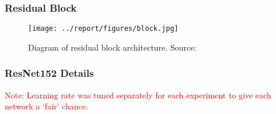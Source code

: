 \documentclass[11pt]{beamer}
\begin{document}
\begin{frame}
	\frametitle{Residual Block}

	\begin{figure}[h]
	\begin{center}
	\vspace*{-0.5cm}
	\texttt{[image: ../report/figures/block.jpg]}
	\caption[caption]{Diagram of residual block architecture. Source: \cite{dive}}
	\label{fig:block}
	\end{center}
	\end{figure}

\end{frame}

\begin{frame}
	\frametitle{ResNet152 Details}

	\pause
	\begin{table}[h]
	\begin{center}

	\vspace*{-0.5cm}
	\hspace*{-0.25cm}
	\vspace{0.1cm}
	\caption{Model hyperparameter values.}
	\label{tab:model-prefs}
	\end{center}
	\end{table}

	\pause
	\vspace{1cm}
	\textcolor{red}{Note: Learning rate was tuned separately for each experiment to give each network a `fair' chance.}
\end{frame}
\end{document}
